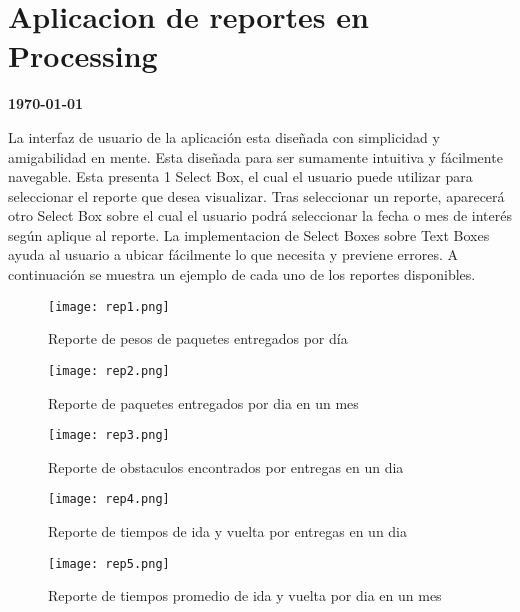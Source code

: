 \documentclass[a4paper,12pt]{article}
\newcommand{\titulo}{Aplicacion de reportes en Processing}
\begin{document}
\section{\titulo}
\begin{center}
\textbf{\today}
\end{center}
La interfaz de usuario de la aplicación esta diseñada con simplicidad 
y amigabilidad en mente. Esta diseñada para ser sumamente intuitiva
y fácilmente navegable. 
Esta presenta 1 Select Box, el cual el usuario puede utilizar para 
seleccionar el reporte que desea visualizar. Tras seleccionar un 
reporte, aparecerá otro Select Box sobre el cual el usuario 
podrá seleccionar la fecha o mes de interés según aplique al reporte.
La implementacion de Select Boxes sobre Text Boxes ayuda al usuario a
ubicar fácilmente lo que necesita y previene errores.
A continuación se muestra un ejemplo de cada uno de los 
reportes disponibles.
\begin{figure}[h]
	\texttt{[image: rep1.png]}
		 \caption{Reporte de pesos de paquetes entregados por día}
\end{figure}
\pagebreak
\begin{figure}[h]
	\texttt{[image: rep2.png]}
		 \caption{Reporte de paquetes entregados por dia en un mes}
\end{figure}
\pagebreak
\begin{figure}[h]
	\texttt{[image: rep3.png]}
		 \caption{Reporte de obstaculos encontrados por entregas en un dia}
\end{figure}
\pagebreak
\begin{figure}[h]
	\texttt{[image: rep4.png]}
		 \caption{Reporte de tiempos de ida y vuelta por entregas en un dia}
\end{figure}
\pagebreak
\begin{figure}[h]
	\texttt{[image: rep5.png]}
		 \caption{Reporte de tiempos promedio de ida y vuelta por dia en un mes}
\end{figure}
\end{document}
